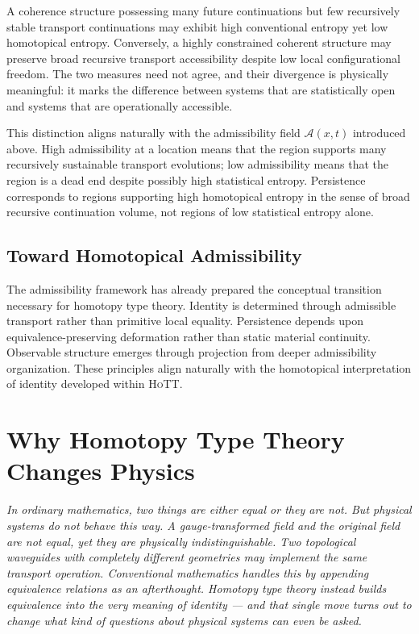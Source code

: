 \documentclass[11pt,openany]{book}
\theoremstyle{definition}
\theoremstyle{plain}
\newcommand{\HoTT}{\textsc{HoTT}}
\newcommand{\Afield}{\mathcal{A}}
\begin{document}
A coherence structure possessing many future continuations but few recursively stable transport continuations may exhibit high conventional entropy yet low homotopical entropy. Conversely, a highly constrained coherent structure may preserve broad recursive transport accessibility despite low local configurational freedom. The two measures need not agree, and their divergence is physically meaningful: it marks the difference between systems that are statistically open and systems that are operationally accessible.

This distinction aligns naturally with the admissibility field $\Afield(x,t)$ introduced above. High admissibility at a location means that the region supports many recursively sustainable transport evolutions; low admissibility means that the region is a dead end despite possibly high statistical entropy. Persistence corresponds to regions supporting high homotopical entropy in the sense of broad recursive continuation volume, not regions of low statistical entropy alone.

\section{Toward Homotopical Admissibility}

The admissibility framework has already prepared the conceptual transition necessary for homotopy type theory. Identity is determined through admissible transport rather than primitive local equality. Persistence depends upon equivalence-preserving deformation rather than static material continuity. Observable structure emerges through projection from deeper admissibility organization. These principles align naturally with the homotopical interpretation of identity developed within \HoTT.


\chapter{Why Homotopy Type Theory Changes Physics}

\noindent\textit{In ordinary mathematics, two things are either equal or they are not. But physical systems do not behave this way. A gauge-transformed field and the original field are not equal, yet they are physically indistinguishable. Two topological waveguides with completely different geometries may implement the same transport operation. Conventional mathematics handles this by appending equivalence relations as an afterthought. Homotopy type theory instead builds equivalence into the very meaning of identity --- and that single move turns out to change what kind of questions about physical systems can even be asked.}
\end{document}
